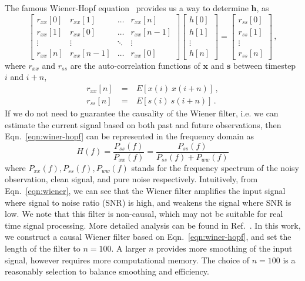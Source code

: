 \documentclass[paper-main.tex]{subfiles}
\begin{document}
The famous Wiener-Hopf equation~\citep{noble1959methods} provides us a way to determine $\textbf{h}$, as
\begin{equation}
\label{eqn:winer-hopf}
\begin{bmatrix}  
r_{xx}[0]&r_{xx}[1]&\dots& r_{xx}[n]\\
r_{xx}[1]&r_{xx}[0]&\dots &r_{xx}[n-1]\\
\vdots&\vdots&\ddots&\vdots\\
r_{xx}[n]&r_{xx}[n-1]&\dots &r_{xx}[0]
\end{bmatrix}
\begin{bmatrix}
h[0]\\
h[1]\\
\vdots\\
h[n]
\end{bmatrix}=
\begin{bmatrix}
r_{ss}[0]\\
r_{ss}[1]\\
\vdots\\
r_{ss}[n]
\end{bmatrix}\,,
\end{equation}
where $r_{xx}$ and $r_{ss}$ are the auto-correlation functions of $\mathbf{x}$ and $\mathbf{s}$ between timestep $i$ and $i+n$, 
\begin{eqnarray} 
r_{xx}[n] &~=~& E[x(i)~x(i+n)] \,,\\
r_{ss}[n] &~=~& E[s(i)~s(i+n)] \,.
\end{eqnarray} 
If we do not need to guarantee the causality of the Wiener filter, i.e. we can estimate the current signal based on both past and future observations, then Eqn.~\ref{eqn:winer-hopf} can be represented in the frequency domain as
\begin{equation}
\label{eqn:wiener}
    H(f)=\frac{P_{ss}(f)}{P_{xx}(f)}=\frac{P_{ss}(f)}{P_{ss}(f)+P_{ww}(f)}
\end{equation}
where $P_{xx}(f),P_{ss}(f),P_{ww}(f)$ stands for the frequency spectrum of the noisy observation, clean signal, and pure noise respectively. 
Intuitively, from Eqn.~\ref{eqn:wiener}, we can see that the Wiener filter amplifies the input signal where signal to noise ratio (SNR) is high, and weakens the signal where SNR is low.
We note that this filter is non-causal, which may not be suitable for real time signal processing. 
More detailed analysis can be found in Ref.~\citep{10.5555/151045}. 
In this work, we construct a causal Wiener filter based on Eqn.~\ref{eqn:winer-hopf}, and set the length of the filter to $n=100$. 
A larger $n$ provides more smoothing of the input signal, however requires more computational memory. 
The choice of $n=100$ is a reasonably selection to balance smoothing and efficiency. 
\end{document}
